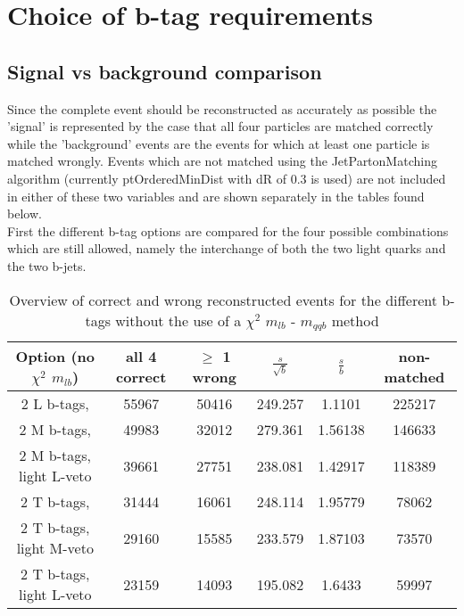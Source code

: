 
\section{Choice of b-tag requirements}

\subsection{Signal vs background comparison}
Since the complete event should be reconstructed as accurately as possible the 'signal' is represented by the case that all four particles are matched correctly while the 'background' events are the events for which at least one particle is matched wrongly.
Events which are not matched using the JetPartonMatching algorithm (currently ptOrderedMinDist with dR of 0.3 is used) are not included in either of these two variables and are shown separately in the tables found below.\\
First the different b-tag options are compared for the four possible combinations which are still allowed, namely the interchange of both the two light quarks and the two b-jets.

 \begin{table}[!h] 
 \begin{tabular}{c|c|c|c|c|c} 
 \textbf{Option} (no $\chi^{2}$ $m_{lb}$) & all 4 correct   & $\geq$ 1 wrong       & $\frac{s}{\sqrt{b}}$ & $\frac{s}{b}$ & non-matched \\ \hline 
2 L b-tags,                & 55967 & 50416 & 249.257 & 1.1101 & 225217 \\ 
2 M b-tags,              & 49983 & 32012 & 279.361 & 1.56138 & 146633 \\ 
2 M b-tags, light L-veto & 39661 & 27751 & 238.081 & 1.42917 & 118389 \\ 
2 T b-tags,              & 31444 & 16061 & 248.114 & 1.95779 & 78062 \\ 
2 T b-tags, light M-veto & 29160 & 15585 & 233.579 & 1.87103 & 73570 \\ 
2 T b-tags, light L-veto & 23159 & 14093 & 195.082 & 1.6433 & 59997 \\ 
 \end{tabular} 
 \caption{Overview of correct and wrong reconstructed events for the different b-tags without the use of a $\chi^{2}$ $m_{lb}$ - $m_{qqb}$ method} 
 \end{table} 
 
